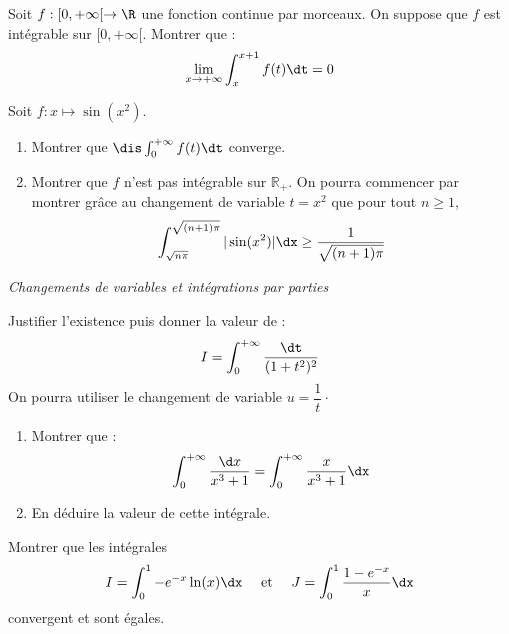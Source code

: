 \documentclass[a4paper,10pt]{report}
\begin{document}
\begin{Exa}  Soit $f :[0, + \infty[ \rightarrow \R$ une fonction continue par morceaux.  On suppose que $f$ est intégrable sur $[0, + \infty[$.  Montrer que :
  \[
  \lim_{x \rightarrow + \infty} \int_{x}^{x + 1} f(t) \dt =0 
  \]
\end{Exa}



\begin{Exa}
Soit $f : x \mapsto \sin(x^2)$.
\begin{enumerate}
\item Montrer que $\dis \int_{0}^{+ \infty}  f(t) \dt$ converge.
\item Montrer que $f$ n'est pas intégrable sur $\mathbb{R}_+$. On pourra commencer par montrer grâce au changement de variable $t=x^2$ que pour tout $n \geq 1$,
$$ \int_{\sqrt{n \pi}}^{\sqrt{(n+1)\pi}} \vert \sin(x^2) \vert \dx \geq \frac{1}{\sqrt{(n+1) \pi}}$$
\end{enumerate}
\end{Exa}


\medskip

\begin{center}
\textit{{ {\large Changements de variables et intégrations par parties}}}
\end{center}

\medskip


\begin{Exa} Justifier l'existence puis donner la valeur de :
  \[
  I = \int_{0}^{ + \infty} \frac{\dt}{(1 + t^{2})^{2}}
  \]
On pourra utiliser le changement de variable $u = \dfrac{1}{t} \cdot$
\end{Exa}


\begin{Exa}
\begin{enumerate}
  \item
    Montrer que :
    \[
\int_{0}^{ + \infty} \frac{\d x}{x^{3} + 1} = \int_{0}^{ + \infty} \frac{x}{x^{3} + 1}\dx
    \]
  \item
    En déduire la valeur de cette intégrale.
  \end{enumerate}
\end{Exa} 





\begin{Exa} Montrer que les intégrales 
$$ I=\int_{0}^1 -e^{-x} \ln(x) \dx \quad \hbox{ et } \quad J= \int_{0}^1 \frac{1-e^{-x}}{x} \dx$$
convergent et sont égales.
\end{Exa}
\end{document}

